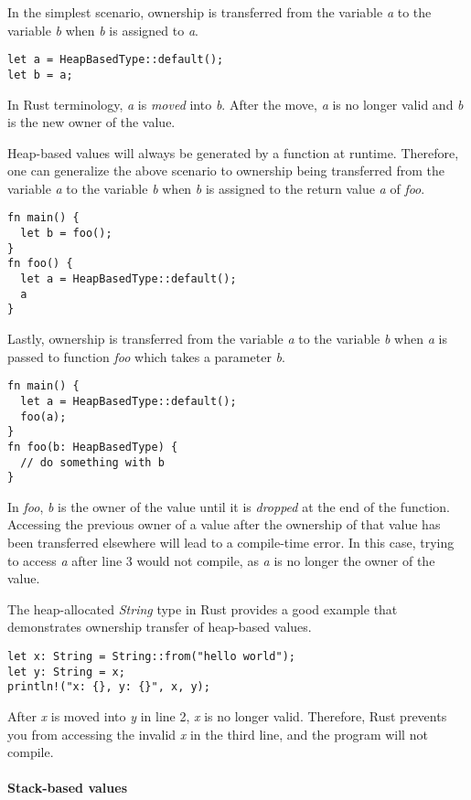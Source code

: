 \documentclass[sigplan,11pt,nonacm]{acmart}
\begin{document}
In the simplest scenario, ownership is transferred from the variable \emph{a} to the variable \emph{b} when \emph{b} is assigned to \emph{a}.
\begin{lstlisting}
let a = HeapBasedType::default();
let b = a;
\end{lstlisting}
In Rust terminology, \emph{a} is \emph{moved} into \emph{b}.
After the move, \emph{a} is no longer valid and \emph{b} is the new owner of the value.

Heap-based values will always be generated by a function at runtime.
Therefore, one can generalize the above scenario to ownership being transferred from the variable \emph{a} to the variable \emph{b} when \emph{b} is assigned to the return value \emph{a} of \emph{foo}.
\begin{lstlisting}
fn main() {
  let b = foo();
}
fn foo() {
  let a = HeapBasedType::default();
  a
}
\end{lstlisting}

Lastly, ownership is transferred from the variable \emph{a} to the variable \emph{b} when \emph{a} is passed to function \emph{foo} which takes a parameter \emph{b}.
\begin{lstlisting}
fn main() {
  let a = HeapBasedType::default();
  foo(a);
}
fn foo(b: HeapBasedType) {
  // do something with b
}
\end{lstlisting}
In \emph{foo}, \emph{b} is the owner of the value until it is \emph{dropped} at the end of the function.
Accessing the previous owner of a value after the ownership of that value has been transferred elsewhere will lead to a compile-time error.
In this case, trying to access \emph{a} after line 3 would not compile, as \emph{a} is no longer the owner of the value.

The heap-allocated \emph{String} type in Rust provides a good example that demonstrates ownership transfer of heap-based values.
\begin{lstlisting}
let x: String = String::from("hello world");
let y: String = x;
println!("x: {}, y: {}", x, y);
\end{lstlisting}
After \emph{x} is moved into \emph{y} in line 2, \emph{x} is no longer valid.
Therefore, Rust prevents you from accessing the invalid \emph{x} in the third line, and the program will not compile.

\paragraph{Stack-based values}
\end{document}

